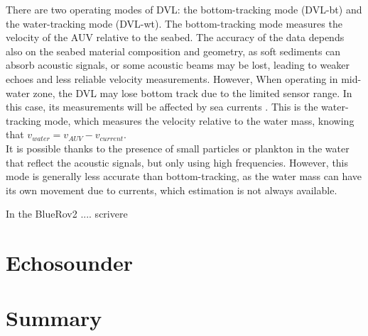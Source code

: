There are two operating modes of DVL: the bottom-tracking mode (DVL-bt) and the water-tracking mode (DVL-wt). The bottom-tracking mode measures the velocity of the AUV relative to the seabed. 
The accuracy of the data depends also on the seabed material composition and geometry, as soft sediments can absorb acoustic signals, or some acoustic beams may be lost, leading to weaker 
echoes and less reliable velocity measurements. However, When operating in mid-water zone, the DVL may lose bottom track due to the limited sensor range. In this case, its measurements will be affected by sea currents \cite{liuSINSDVLIntegrated2022}.
This is the water-tracking mode, which measures the velocity relative to the water mass, knowing that $v_{water} = v_{AUV} - v_{current}$.\\
It is possible thanks to the presence of small particles or plankton in the water that reflect the acoustic signals, but only using high frequencies. However, this mode is generally less accurate 
than bottom-tracking, as the water mass can have its own movement due to currents, which estimation is not always available.

In the BlueRov2 .... {scrivere}

\section{Echosounder}

\section{Summary}